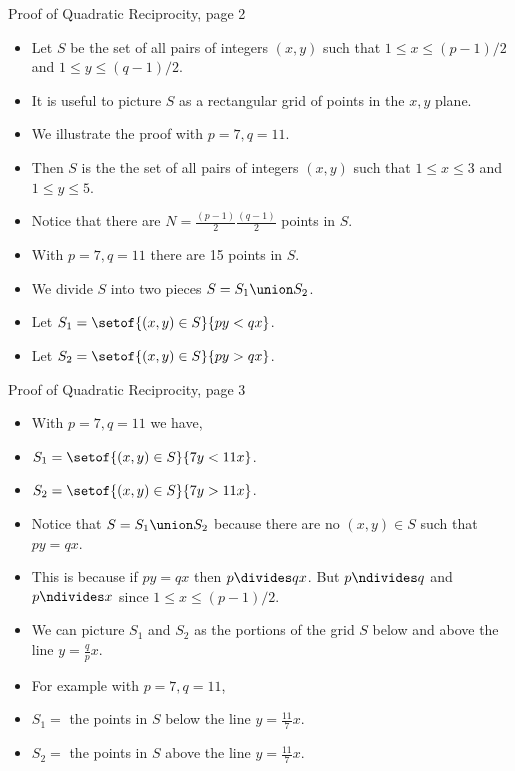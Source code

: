 \documentclass[handout]{beamer}
\begin{document}

\begin{frame}{Proof of Quadratic Reciprocity, page 2}

\begin{itemize}
  \item Let $S$ be the set of all pairs of integers $(x,y)$ such that
  $1\leq x \leq (p-1)/2$ and $1\leq y \leq (q-1)/2$.
  \item It is useful to picture $S$ as a rectangular grid of points in the $x,y$ plane.
  \item We illustrate the proof with $p=7, q=11$.
  \item Then $S$ is the the set of all pairs of integers $(x,y)$ such that
  $1\leq x \leq 3$ and $1\leq y \leq 5$.
  \item Notice that there are $N = \frac{(p-1)}{2}\frac{(q-1)}{2}$ points in $S$.
  \item With $p=7, q=11$ there are 15 points in $S$.
  \item We divide $S$ into two pieces $S = S_1 \union S_2$.
  \item Let $S_1 = \setof{(x,y)\in S}{py < qx}$.
  \item Let $S_2 = \setof{(x,y)\in S}{py > qx}$.
\end{itemize}
\end{frame}

\begin{frame}{Proof of Quadratic Reciprocity, page 3}

\begin{itemize}
  \item With $p=7, q=11$ we have,
  \item $S_1 = \setof{(x,y)\in S}{7y < 11x}$.
  \item $S_2 = \setof{(x,y)\in S}{7y > 11x}$.
  \item Notice that $S= S_1 \union S_2$ because there are no $(x,y)\in S$ such that $py = qx$.
  \item This is because if $py=qx$ then $p\divides qx$. But $p\ndivides q$ and $p\ndivides x$ since $1\leq x \leq (p-1)/2$.
  \item We can picture $S_1$ and $S_2$ as the portions of the grid $S$ below and above the line $y=\frac{q}{p} x$.
  \item For example with $p=7, q=11$,
  \item $S_1 = $ the points in $S$ below the line $y=\frac{11}{7}x$.
  \item $S_2 = $ the points in $S$ above the line $y=\frac{11}{7}x$.
\end{itemize}
\end{frame}
\end{document}
